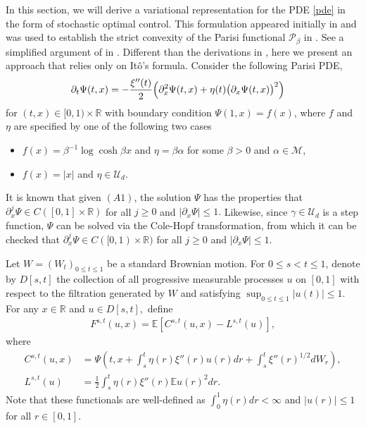 \documentclass[12pt]{article}
\newcommand{\e}{\mathbb{E}}
\newenvironment{Proof of lemma}{\noindent{\bf Proof of Lemma}}{\hfill$\Box$\newline}
\newenvironment{Proof of theorem}{\noindent{\bf Proof of Theorem}}{\hfill{\footnotesize${\square}$}\newline}
\newenvironment{Proof of theorems}{\noindent{\bf Proof of Theorems}}{\hfill$\Box$\newline}
\newenvironment{Proof of proposition}{\noindent{\bf Proof of Proposition}}{\hfill$\Box$\newline}
\newenvironment{Proof of propositions}{\noindent{\bf Proof of Propositions}}{\hfill$\Box$\newline}
\newenvironment{Proof of exercise}{\noindent{\it Proof of Exercise:}}{\hfill$\Box$}
\begin{document}
In this section, we will derive a variational representation for the PDE \eqref{pde} in the form of stochastic optimal control. This formulation appeared initially in \cite{BK} and was used to establish the strict convexity of the Parisi functional $\mathcal{P}_\beta$ in \cite{AC14}. See a simplified argument of \cite{AC14} in \cite{JT2}. Different than the derivations in \cite{AC14,BK,JT2}, here we present an approach that relies only on It\^{o}'s formula. Consider the following Parisi PDE,
\begin{align}\label{pde2}
\partial_t\Psi(t,x)&=-\frac{\xi''(t)}{2}\Bigl(\partial_{x}^2\Psi(t,x)+\eta(t)\bigl(\partial_x\Psi(t,x)\bigr)^2\Bigr)
\end{align}
for $(t,x)\in[0,1)\times\mathbb{R}$ with boundary condition $\Psi(1,x)=f(x)$, where $f$ and $\eta$ are specified by one of the following two cases
\begin{itemize}
	\item[$(A1)$] $f(x)=\beta^{-1}\log \cosh \beta x$ and $\eta=\beta \alpha$ for some $\beta>0$ and $\alpha\in\mathcal{M}$,
	\item[$(A2)$] $f(x)=|x|$ and $\eta\in\mathcal{U}_d.$
\end{itemize} 
It is known \cite{AC13,JT2} that given $(A1)$, the solution $\Psi$ has the properties that $\partial_x^j\Psi\in C([0,1]\times\mathbb{R})$ for all $j\geq 0$ and $|\partial_x\Psi|\leq 1.$
Likewise, since $\gamma\in\mathcal{U}_d$ is a step function, $\Psi$ can be solved via the Cole-Hopf transformation, from which it can be checked that $\partial_x^j\Psi\in C([0,1)\times\mathbb{R})$ for all $j\geq 0$ and $|\partial_x\Psi|\leq 1.$ 

Let $W=(W_t)_{0\leq t\leq 1}$ be a standard Brownian motion. For $0\leq s<t\leq 1$, denote by $D[s,t]$ the collection of all progressive measurable processes $u$ on $[0,1]$ with respect to the filtration generated by $W$ and satisfying $\sup_{0\leq t\leq 1}|u(t)|\leq 1.$ For any $x\in\mathbb{R}$ and $u\in D[s,t],$ define
\begin{align*}
F^{s,t}(u,x)=\e\left[C^{s,t}(u,x)-L^{s,t}(u)\right],
\end{align*}
where
\begin{align*}
C^{s,t}(u,x)&=\Psi\left(t,x+\int_s^t\eta(r)\xi''(r)u(r)dr+\int_s^t\xi''(r)^{1/2}dW_r\right),\\
L^{s,t}(u)&=\frac{1}{2}\int_s^t\eta(r)\xi''(r)\e u(r)^2dr.
\end{align*} 
Note that these functionals are well-defined as $\int_{0}^{1}\eta (r) dr <\infty$ and $|u(r)| \leq 1$ for all $r \in [0,1]$.
\end{document}
